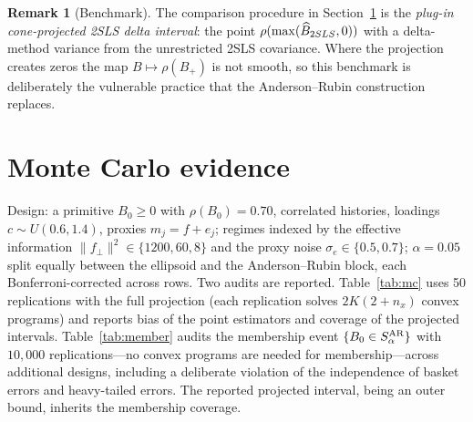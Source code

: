\documentclass[12pt]{article}
\theoremstyle{plain}\newtheorem{theorem}{Theorem}[section]\newtheorem{proposition}[theorem]{Proposition}\newtheorem{lemma}[theorem]{Lemma}\newtheorem{corollary}[theorem]{Corollary}
\theoremstyle{definition}\newtheorem{definition}[theorem]{Definition}\newtheorem{assumption}[theorem]{Assumption}\newtheorem{remark}[theorem]{Remark}
\begin{document}
\begin{remark}[Benchmark]
The comparison procedure in Section~\ref{sec:mc} is the \emph{plug-in cone-projected 2SLS delta interval}: the point $\rho(\max(\widehat B_{2SLS},0))$ with a delta-method variance from the unrestricted 2SLS covariance. Where the projection creates zeros the map $B\mapsto\rho(B_+)$ is not smooth, so this benchmark is deliberately the vulnerable practice that the Anderson--Rubin construction replaces.
\end{remark}

\section{Monte Carlo evidence}\label{sec:mc}
Design: a primitive $B_0\ge0$ with $\rho(B_0)=0.70$, correlated histories, loadings $c\sim U(0.6,1.4)$, proxies $m_j=f+e_j$; regimes indexed by the effective information $\|f_\perp\|^2\in\{1200,60,8\}$ and the proxy noise $\sigma_e\in\{0.5,0.7\}$; $\alpha=0.05$ split equally between the ellipsoid and the Anderson--Rubin block, each Bonferroni-corrected across rows. Two audits are reported. Table~\ref{tab:mc} uses 50 replications with the full projection (each replication solves $2K(2+n_x)$ convex programs) and reports bias of the point estimators and coverage of the projected intervals. Table~\ref{tab:member} audits the membership event $\{B_0\in S^{\rm AR}_\alpha\}$ with $10{,}000$ replications---no convex programs are needed for membership---across additional designs, including a deliberate violation of the independence of basket errors and heavy-tailed errors. The reported projected interval, being an outer bound, inherits the membership coverage.
\begin{table}[t]\centering\small
\caption{Bias of cascade-risk estimators and coverage of nominal 95\% intervals ($K=5$, $T=2000$, $\rho(B_0)=0.70$, 50 replications). Empty sets count as failures. AR-unb.: replications in which at least one row's Anderson--Rubin set is unbounded (analytic inversion).}\label{tab:mc}
\end{table}
\end{document}
